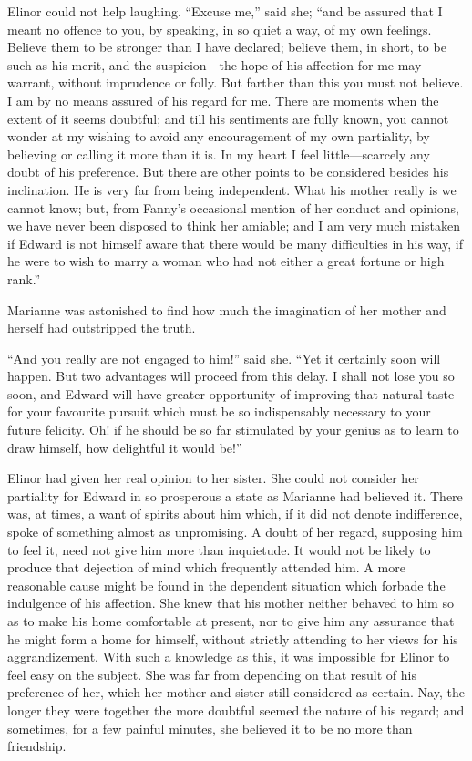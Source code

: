 Elinor could not help laughing.  ``Excuse me,''
said she; ``and be assured that I meant no offence to you,
by speaking, in so quiet a way, of my own feelings.
Believe them to be stronger than I have declared;
believe them, in short, to be such as his merit, and the
suspicion---the hope of his affection for me may warrant,
without imprudence or folly.  But farther than this you must
not believe.  I am by no means assured of his regard for me.
There are moments when the extent of it seems doubtful;
and till his sentiments are fully known, you cannot wonder
at my wishing to avoid any encouragement of my own partiality,
by believing or calling it more than it is.  In my heart
I feel little---scarcely any doubt of his preference.
But there are other points to be considered besides
his inclination.  He is very far from being independent.
What his mother really is we cannot know; but, from Fanny's
occasional mention of her conduct and opinions, we have
never been disposed to think her amiable; and I am very
much mistaken if Edward is not himself aware that there
would be many difficulties in his way, if he were to wish
to marry a woman who had not either a great fortune or
high rank.''

Marianne was astonished to find how much the imagination
of her mother and herself had outstripped the truth.

``And you really are not engaged to him!'' said she.
``Yet it certainly soon will happen.  But two advantages
will proceed from this delay.  I shall not lose you so soon,
and Edward will have greater opportunity of improving
that natural taste for your favourite pursuit which must
be so indispensably necessary to your future felicity.
Oh! if he should be so far stimulated by your genius as to
learn to draw himself, how delightful it would be!''

Elinor had given her real opinion to her sister.
She could not consider her partiality for Edward
in so prosperous a state as Marianne had believed it.
There was, at times, a want of spirits about him which,
if it did not denote indifference, spoke of something almost
as unpromising.  A doubt of her regard, supposing him
to feel it, need not give him more than inquietude.
It would not be likely to produce that dejection of mind
which frequently attended him.  A more reasonable cause
might be found in the dependent situation which forbade
the indulgence of his affection.  She knew that his mother
neither behaved to him so as to make his home comfortable
at present, nor to give him any assurance that he might form
a home for himself, without strictly attending to her views
for his aggrandizement.  With such a knowledge as this,
it was impossible for Elinor to feel easy on the subject.
She was far from depending on that result of his preference
of her, which her mother and sister still considered
as certain.  Nay, the longer they were together the more
doubtful seemed the nature of his regard; and sometimes,
for a few painful minutes, she believed it to be no more
than friendship.


